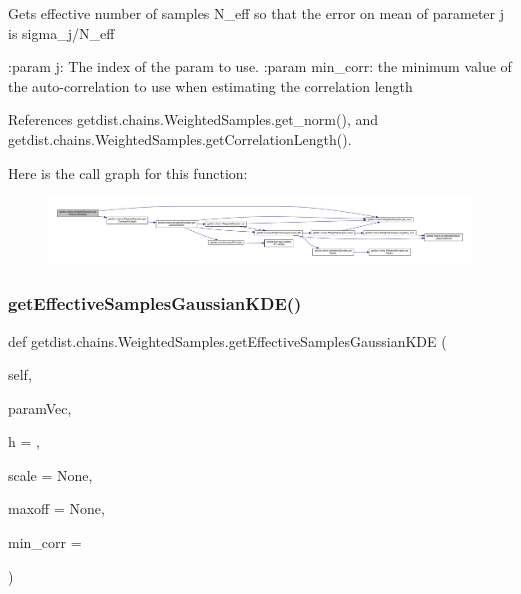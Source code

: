 \begin{DoxyVerb}Gets effective number of samples N_eff so that the error on mean of parameter j is sigma_j/N_eff

:param j: The index of the param to use.
:param min_corr: the minimum value of the auto-correlation to use when estimating the correlation length
\end{DoxyVerb}
 

References getdist.\+chains.\+Weighted\+Samples.\+get\+\_\+norm(), and getdist.\+chains.\+Weighted\+Samples.\+get\+Correlation\+Length().

Here is the call graph for this function\+:
\nopagebreak
\begin{figure}[H]
\begin{center}
\leavevmode
\includegraphics[width=350pt]{classgetdist_1_1chains_1_1WeightedSamples_a2a9c6bc9d303e07c06cd8d44a6c67838_cgraph}
\end{center}
\end{figure}
\mbox{\label{classgetdist_1_1chains_1_1WeightedSamples_acc6bb1ecddcbbfa0f9db00442ccc380b}} 
\subsubsection{\texorpdfstring{get\+Effective\+Samples\+Gaussian\+K\+D\+E()}{getEffectiveSamplesGaussianKDE()}}
{\footnotesize\ttfamily def getdist.\+chains.\+Weighted\+Samples.\+get\+Effective\+Samples\+Gaussian\+K\+DE (\begin{DoxyParamCaption}\item[{}]{self,  }\item[{}]{param\+Vec,  }\item[{}]{h = {},  }\item[{}]{scale = {\ttfamily None},  }\item[{}]{maxoff = {\ttfamily None},  }\item[{}]{min\+\_\+corr = {} }\end{DoxyParamCaption})}

